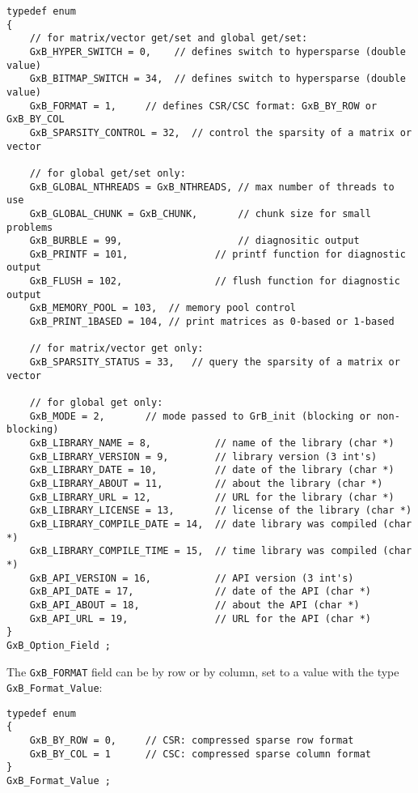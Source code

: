 \documentclass[12pt]{article}
\begin{document}
{{\footnotesize
\begin{verbatim}
typedef enum
{
    // for matrix/vector get/set and global get/set:
    GxB_HYPER_SWITCH = 0,    // defines switch to hypersparse (double value)
    GxB_BITMAP_SWITCH = 34,  // defines switch to hypersparse (double value)
    GxB_FORMAT = 1,     // defines CSR/CSC format: GxB_BY_ROW or GxB_BY_COL
    GxB_SPARSITY_CONTROL = 32,  // control the sparsity of a matrix or vector

    // for global get/set only:
    GxB_GLOBAL_NTHREADS = GxB_NTHREADS, // max number of threads to use
    GxB_GLOBAL_CHUNK = GxB_CHUNK,       // chunk size for small problems
    GxB_BURBLE = 99,                    // diagnositic output
    GxB_PRINTF = 101,               // printf function for diagnostic output
    GxB_FLUSH = 102,                // flush function for diagnostic output
    GxB_MEMORY_POOL = 103,  // memory pool control
    GxB_PRINT_1BASED = 104, // print matrices as 0-based or 1-based

    // for matrix/vector get only:
    GxB_SPARSITY_STATUS = 33,   // query the sparsity of a matrix or vector

    // for global get only:
    GxB_MODE = 2,       // mode passed to GrB_init (blocking or non-blocking)
    GxB_LIBRARY_NAME = 8,           // name of the library (char *)
    GxB_LIBRARY_VERSION = 9,        // library version (3 int's)
    GxB_LIBRARY_DATE = 10,          // date of the library (char *)
    GxB_LIBRARY_ABOUT = 11,         // about the library (char *)
    GxB_LIBRARY_URL = 12,           // URL for the library (char *)
    GxB_LIBRARY_LICENSE = 13,       // license of the library (char *)
    GxB_LIBRARY_COMPILE_DATE = 14,  // date library was compiled (char *)
    GxB_LIBRARY_COMPILE_TIME = 15,  // time library was compiled (char *)
    GxB_API_VERSION = 16,           // API version (3 int's)
    GxB_API_DATE = 17,              // date of the API (char *)
    GxB_API_ABOUT = 18,             // about the API (char *)
    GxB_API_URL = 19,               // URL for the API (char *)
}
GxB_Option_Field ;
\end{verbatim} }

The \verb'GxB_FORMAT' field can be by row or by column, set to a value
with the type \verb'GxB_Format_Value':

{\footnotesize
\begin{verbatim}
typedef enum
{
    GxB_BY_ROW = 0,     // CSR: compressed sparse row format
    GxB_BY_COL = 1      // CSC: compressed sparse column format
}
GxB_Format_Value ;
\end{verbatim} }

}
\end{document}
